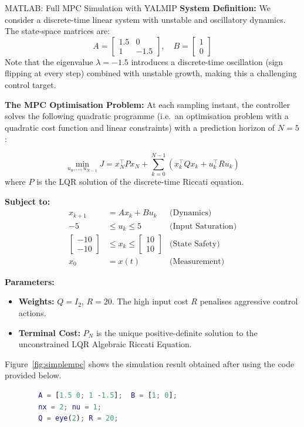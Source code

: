 \begin{examplebox}{MATLAB: Full MPC Simulation with YALMIP}
	\textbf{System Definition:}
	We consider a discrete-time linear system with unstable and oscillatory dynamics. The state-space matrices are:
	\begin{equation*}
		A = \begin{bmatrix} 1.5 & 0 \\ 1 & -1.5 \end{bmatrix}, \quad B = \begin{bmatrix} 1 \\ 0 \end{bmatrix}
	\end{equation*}
	Note that the eigenvalue $\lambda = -1.5$ introduces a discrete-time oscillation (sign flipping at every step) combined with unstable growth, making this a challenging control target.
	
	\textbf{The MPC Optimisation Problem:}
	At each sampling instant, the controller solves the following quadratic programme (i.e.\ an optimisation problem with a quadratic cost function and linear constraints) with a prediction horizon of $N=5$:
	
	\begin{equation*}
		\min_{u_0, \dots, u_{N-1}} J = x_N^\top P x_N + \sum_{k=0}^{N-1} \left( x_k^\top Q x_k + u_k^\top R u_k \right)
	\end{equation*}
	where $P$ is the LQR solution of the discrete-time Riccati equation.
	
	\textbf{Subject to:}
	\begin{align*}
		x_{k+1} &= A x_k + B u_k & \text{(Dynamics)}\\
		-5 &\leq u_k \leq 5 & \text{(Input Saturation)}\\
		\begin{bmatrix} -10 \\ -10 \end{bmatrix} &\leq x_k \leq \begin{bmatrix} 10 \\ 10 \end{bmatrix} & \text{(State Safety)}\\
		x_0 &= x(t) & \text{(Measurement)}
	\end{align*}
	
	\textbf{Parameters:}
	\begin{itemize}
		\item \textbf{Weights:} $Q = I_2$, $R = 20$. The high input cost $R$ penalises aggressive control actions.
		\item \textbf{Terminal Cost:} $P_N$ is the unique positive-definite solution to the unconstrained LQR Algebraic Riccati Equation.
	\end{itemize}
	Figure~\ref{fig:simplempc} shows the simulation result obtained after using the code provided below.
	\begin{lstlisting}[language=Matlab]
		% 1. System Matrices & MPC Weights
		A = [1.5 0; 1 -1.5];  B = [1; 0];
		nx = 2; nu = 1;
		Q = eye(2); R = 20;
		

\end{lstlisting}
\end{examplebox}
